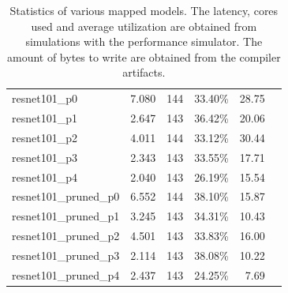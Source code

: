 \begin{table}[hbtp]
\begin{tabular}{@{}lrrrrr@{}}
resnet101\_p0           & 7.080                                                           & 144            & 33.40\%            & 28.75                                                             \\
resnet101\_p1           & 2.647                                                           & 143            & 36.42\%            & 20.06                                                             \\
resnet101\_p2           & 4.011                                                           & 144            & 33.12\%            & 30.44                                                             \\
resnet101\_p3           & 2.343                                                           & 143            & 33.55\%            & 17.71                                                             \\
resnet101\_p4           & 2.040                                                           & 143            & 26.19\%            & 15.54                                                             \\
resnet101\_pruned\_p0   & 6.552                                                           & 144            & 38.10\%            & 15.87                                                             \\
resnet101\_pruned\_p1   & 3.245                                                           & 143            & 34.31\%            & 10.43                                                             \\
resnet101\_pruned\_p2   & 4.501                                                           & 143            & 33.83\%            & 16.00                                                             \\
resnet101\_pruned\_p3   & 2.114                                                           & 143            & 38.08\%            & 10.22                                                             \\
resnet101\_pruned\_p4   & 2.437                                                           & 143            & 24.25\%            & 7.69                                                              \\
\bottomrule
\end{tabular}
\caption{
    Statistics of various mapped models.
    The latency, cores used and average utilization are obtained from simulations with the performance simulator.
    The amount of bytes to write are obtained from the compiler artifacts.
}
\label{tab:example_models_stats}
\end{table}

